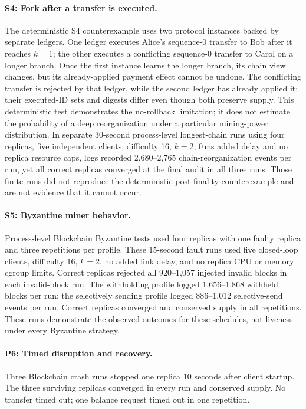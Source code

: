 \documentclass[sigconf,a4paper]{acmart}
\begin{document}
    \paragraph{S4: Fork after a transfer is executed.}
    The deterministic S4 counterexample uses two protocol instances backed by
    separate ledgers. One ledger executes Alice's sequence-0 transfer to Bob
    after it reaches $k=1$; the other executes a conflicting sequence-0 transfer
    to Carol on a longer branch. Once the first instance learns the longer
    branch, its chain view changes, but its already-applied payment effect cannot
    be undone. The conflicting transfer is rejected by that ledger, while the
    second ledger has already applied it; their executed-ID sets and digests
    differ even though both preserve supply. This deterministic test
    demonstrates the no-rollback limitation; it does not estimate the
    probability of a deep reorganization under a particular mining-power
    distribution. In separate 30-second process-level longest-chain runs using
    four replicas, five independent clients, difficulty 16, $k=2$, 0\,ms added
    delay and no replica resource caps, logs recorded 2,680--2,765
    chain-reorganization events per run, yet all correct replicas converged at
    the final audit in all three runs. Those finite runs did not reproduce the
    deterministic post-finality counterexample and are not evidence that it
    cannot occur.

    \paragraph{S5: Byzantine miner behavior.}
    Process-level Blockchain Byzantine tests used four replicas with one faulty
    replica and three repetitions per profile. These 15-second fault runs used
    five closed-loop clients, difficulty 16, $k=2$, no added link delay, and no
    replica CPU or memory cgroup limits. Correct replicas rejected all
    920--1,057 injected invalid blocks in each invalid-block run. The withholding
    profile logged 1,656--1,868 withheld blocks per run; the selectively sending
    profile logged 886--1,012 selective-send events per run. Correct replicas
    converged and conserved supply in all repetitions. These runs demonstrate
    the observed outcomes for these schedules, not liveness under every
    Byzantine strategy.

    \paragraph{P6: Timed disruption and recovery.}
    Three Blockchain crash runs stopped one replica 10 seconds after client
    startup. The three surviving replicas converged in every run and conserved
    supply. No transfer timed out; one balance request timed out in one
    repetition.
\end{document}
